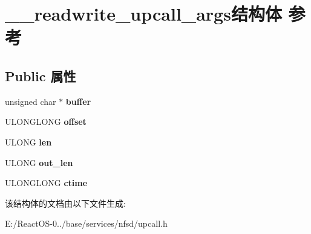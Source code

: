 \hypertarget{struct____readwrite__upcall__args}{}\section{\+\_\+\+\_\+readwrite\+\_\+upcall\+\_\+args结构体 参考}
\label{struct____readwrite__upcall__args}
\subsection*{Public 属性}
\begin{DoxyCompactItemize}
\item 
\mbox{\label{struct____readwrite__upcall__args_a9036e9850cc1f9ba5bc9f384a687a6de}} 
unsigned char $\ast$ {\bfseries buffer}
\item 
\mbox{\label{struct____readwrite__upcall__args_acd7477e7ccbedb085317a5e1165949f7}} 
U\+L\+O\+N\+G\+L\+O\+NG {\bfseries offset}
\item 
\mbox{\label{struct____readwrite__upcall__args_a8964382eb9be9728fc21da21a7692d10}} 
U\+L\+O\+NG {\bfseries len}
\item 
\mbox{\label{struct____readwrite__upcall__args_a51202181912ef7cfd8e493605bb265de}} 
U\+L\+O\+NG {\bfseries out\+\_\+len}
\item 
\mbox{\label{struct____readwrite__upcall__args_ae2ffed4641a6aeda79b09cf43d00d95c}} 
U\+L\+O\+N\+G\+L\+O\+NG {\bfseries ctime}
\end{DoxyCompactItemize}


该结构体的文档由以下文件生成\+:\begin{DoxyCompactItemize}
\item 
E\+:/\+React\+O\+S-\/0../base/services/nfsd/upcall.\+h\end{DoxyCompactItemize}
